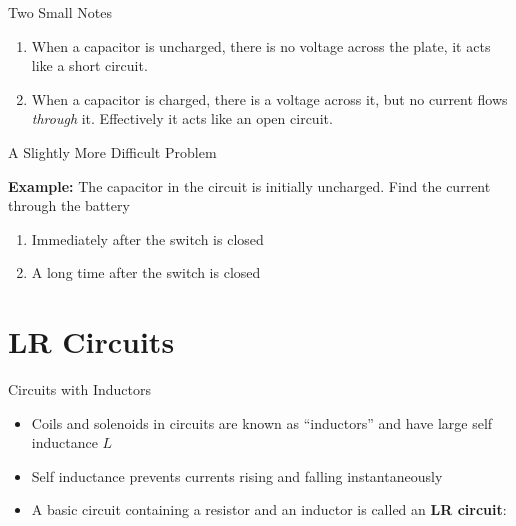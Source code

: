 \documentclass[12pt,aspectratio=169]{beamer}
\begin{document}
\begin{frame}{Two Small Notes}
  \begin{enumerate}
  \item When a capacitor is uncharged, there is no voltage across the plate,
    it acts like a short circuit.
  \item When a capacitor is charged, there is a voltage across it, but no
    current flows \emph{through} it. Effectively it acts like an open circuit.
  \end{enumerate}
\end{frame}



\begin{frame}{A Slightly More Difficult Problem}
  \begin{center}
  \end{center}
  \textbf{Example:} The capacitor in the circuit is initially uncharged. Find
  the current through the battery
  \begin{enumerate}
  \item Immediately after the switch is closed
  \item A long time after the switch is closed
  \end{enumerate}
\end{frame}



\section{LR Circuits}

\begin{frame}{Circuits with Inductors}
  \begin{itemize}
  \item Coils and solenoids in circuits are known as ``inductors'' and have
    large self inductance $L$
  \item Self inductance prevents currents rising and falling instantaneously
  \item A basic circuit containing a resistor and an inductor is called an
    \textbf{LR circuit}:
    \begin{center}
    \end{center}
  \end{itemize}
\end{frame}
\end{document}
